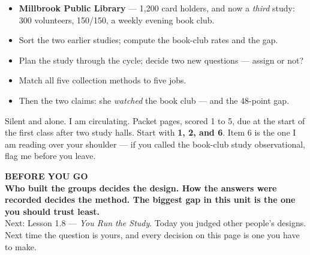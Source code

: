 \documentclass[aspectratio=169, 11pt]{beamer}
\begin{document}
\begin{frame}[t, plain]
  \begin{itemize}\setlength{\itemsep}{5pt}
    \item \textbf{Millbrook Public Library} --- 1{,}200 card holders, and now a \emph{third}
          study: 300 volunteers, 150/150, a weekly evening book club.
    \item Sort the two earlier studies; compute the book-club rates and the gap.
    \item Plan the study through the cycle; decide two new questions --- assign or not?
    \item Match all five collection methods to five jobs.
    \item Then the two claims: she \emph{watched} the book club --- and the 48-point gap.
  \end{itemize}
  \begin{block}{Silent and alone. I am circulating. Packet pages, scored 1 to 5, due at the start of the first class after two study halls.}
    Start with \textbf{1, 2, and 6}. Item 6 is the one I am reading over your shoulder --- if
    you called the book-club study observational, flag me before you leave.
  \end{block}
\end{frame}

{
\begin{frame}[plain]
  \vspace{1.5cm}\hspace{0.8cm}%
  \begin{minipage}{0.86\textwidth}
    {\color{goldacc}\bfseries\small BEFORE YOU GO}\\[0.7cm]
    {\color{white}\bfseries\Large Who built the groups decides the design. How the answers were
    recorded decides the method. The biggest gap in this unit is the one you should trust
    least.}\\[0.9cm]
    {\color{frostmid}\small Next: Lesson 1.8 --- \emph{You Run the Study}. Today you judged
    other people's designs. Next time the question is yours, and every decision on this page is
    one you have to make.}
  \end{minipage}
\end{frame}
}
\end{document}
